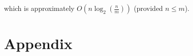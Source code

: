 \documentclass[12pt]{article}
\begin{document}
which is approximately $O(n\log_2{(\frac{n}{m})})$ (provided $n\le m$).



\section*{Appendix}


%






\end{document}
